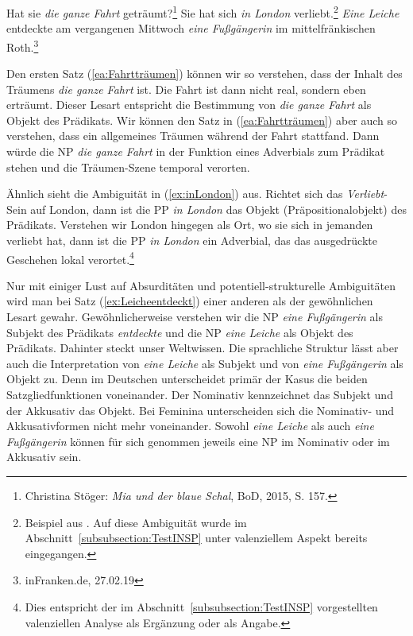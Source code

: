 \ea \label{ea:SGAmbiguität}
\ea \label{ea:Fahrtträumen} Hat sie \textit{die ganze Fahrt} geträumt?\footnote{Christina Stöger: \textit{Mia und der blaue Schal}, BoD, 2015, S. 157.}
\ex \label{ex:inLondon} Sie hat sich \textit{in London} verliebt.\footnote{Beispiel aus \citet[259]{Fischer2001}. Auf diese Ambiguität wurde im Abschnitt~\ref{subsubsection:TestINSP} unter valenziellem Aspekt bereits eingegangen.}
\ex \label{ex:Leicheentdeckt} \textit{Eine Leiche} entdeckte am vergangenen Mittwoch \textit{eine Fußgängerin} im mittelfränkischen Roth.\footnote{inFranken.de, 27.02.19}
\z 
\z 

Den ersten Satz (\ref{ea:Fahrtträumen}) können wir so verstehen, dass der Inhalt des Träumens \textit{die ganze Fahrt} ist. Die Fahrt ist dann nicht real, sondern eben erträumt. Dieser Lesart entspricht die Bestimmung von \textit{die ganze Fahrt} als Objekt des Prädikats. Wir können den Satz in (\ref{ea:Fahrtträumen}) aber auch so verstehen, dass ein allgemeines Träumen während der Fahrt stattfand. Dann würde die NP \textit{die ganze Fahrt} in der Funktion eines Adverbials zum Prädikat stehen und die Träumen-Szene temporal verorten.

Ähnlich sieht die Ambiguität in (\ref{ex:inLondon}) aus. Richtet sich das \textit{Verliebt}-Sein auf London, dann ist die PP \textit{in London} das Objekt (Präpositionalobjekt) des Prädikats. Verstehen wir London hingegen als Ort, wo sie sich in jemanden verliebt hat, dann ist die PP \textit{in London} ein Adverbial, das das ausgedrückte Geschehen lokal verortet.\footnote{Dies entspricht der im Abschnitt~\ref{subsubsection:TestINSP} vorgestellten valenziellen Analyse als Ergänzung oder als Angabe.}   

Nur mit einiger Lust auf Absurditäten und potentiell-strukturelle Ambiguitäten wird man bei Satz (\ref{ex:Leicheentdeckt}) einer anderen als der gewöhnlichen Lesart gewahr. Gewöhnlicherweise verstehen wir die NP \textit{eine Fußgängerin} als Subjekt des Prädikats \textit{entdeckte} und die NP \textit{eine Leiche} als Objekt des Prädikats. Dahinter steckt unser Weltwissen. Die sprachliche Struktur lässt aber auch die Interpretation von \textit{eine Leiche} als Subjekt und von \textit{eine Fußgängerin} als Objekt zu. Denn im Deutschen unterscheidet primär der Kasus die beiden Satzgliedfunktionen voneinander. Der Nominativ kennzeichnet das Subjekt und der Akkusativ das Objekt. Bei Feminina unterscheiden sich die Nominativ- und Akkusativformen nicht mehr voneinander. Sowohl \textit{eine Leiche} als auch \textit{eine Fußgängerin} können für sich genommen jeweils eine NP im Nominativ oder im Akkusativ sein. 

